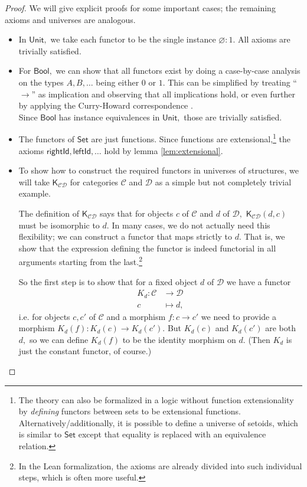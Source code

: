 \documentclass[a4paper]{article}
\theoremstyle{definition}
\theoremstyle{remark}
\renewcommand{\emptyset}{\varnothing}
\newcommand{\C}{\mathcal{C}}
\newcommand{\D}{\mathcal{D}}
\newcommand{\nm}{\mathsf}
\newcommand{\universe}{\nm}
\newcommand{\Unit}{\universe{Unit}}
\newcommand{\Bool}{\universe{Bool}}
\newcommand{\Set}{\universe{Set}}
\newcommand{\combinator}{\nm}
\newcommand{\constFun}{\combinator{K}}
\begin{document}
\begin{proof}
  We will give explicit proofs for some important cases; the remaining axioms and
  universes are analogous.
  \begin{itemize}
    \item In $\Unit,$ we take each functor to be the single instance $\emptyset : 1.$
    All axioms are trivially satisfied.
    \item For $\Bool,$ we can show that all functors exist by doing a case-by-case
    analysis on the types $A,B,\ldots$ being either $0$ or $1.$ This can be simplified by
    treating ``$\to$'' as implication and observing that all implications hold, or even
    further by applying the Curry-Howard correspondence \cite{curry-howard}.\\
    Since $\Bool$ has instance equivalences in $\Unit,$ those are trivially satisfied.
    \item The functors of $\Set$ are just functions. Since functions are
    extensional,\footnote{The theory can also be formalized in a logic without function
    extensionality by \emph{defining} functors between sets to be extensional functions.
    Alternatively/additionally, it is possible to define a universe of setoids, which
    is similar to $\Set$ except that equality is replaced with an equivalence relation.}
    the axioms $\nm{rightId},\nm{leftId},\ldots$ hold by lemma \ref{lem:extensional}.
    \item To show how to construct the required functors in universes of
    structures, we will take $\constFun_{\C\D}$ for categories $\C$ and $\D$ as a
    simple but not completely trivial example.

    The definition of $\constFun_{\C\D}$ says that for objects $c$ of $\C$ and $d$ of
    $\D,$ $\constFun_{\C\D}(d,c)$ must be isomorphic to $d.$ In many cases, we do not
    actually need this flexibility; we can construct a functor that maps strictly to
    $d.$ That is, we show that the expression defining the functor is indeed functorial
    in all arguments starting from the last.\footnote{In the Lean formalization, the
    axioms are already divided into such individual steps, which is often more useful.}

    So the first step is to show that for a fixed object $d$ of $\D$ we have a functor
    \begin{align*}
      K_d : \C &\to     \D\\
            c  &\mapsto d,
    \end{align*}
    i.e. for objects $c,c'$ of $\C$ and a morphism $f : c \to c'$ we need to
    provide a morphism $K_d(f) : K_d(c) \to K_d(c').$ But $K_d(c)$ and $K_d(c')$
    are both $d,$ so we can define $K_d(f)$ to be the identity morphism on $d.$ (Then
    $K_d$ is just the constant functor, of course.)


\end{itemize}
\end{proof}
\end{document}

